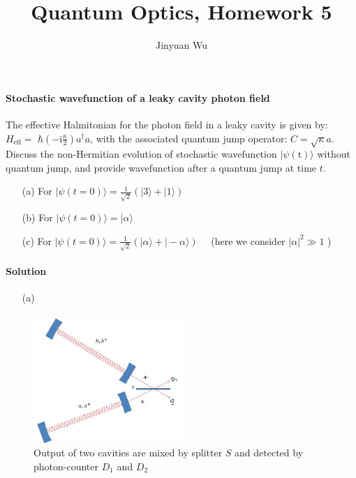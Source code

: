 \documentclass[hyperref, a4paper]{article}
\title{Quantum Optics, Homework 5}
\author{Jinyuan Wu}
\newcommand*{\ii}{\mathrm{i}}
\begin{document}
\maketitle

\paragraph{Stochastic wavefunction of a leaky cavity photon field} The effective Halmitonian for the photon field in a leaky cavity is given by: $H_\text{eff}=$ $\hbar\left(- \ii \frac{\kappa}{2}\right) a^{\dagger} a$, with the associated quantum jump operator: ${C}=\sqrt{\kappa} {a}$.
Discuss the non-Hermitian evolution of stochastic wavefunction $|\psi(\mathrm{t})\rangle$ without quantum jump, and provide wavefunction after a quantum jump at time $t$.
\begin{itemize}
\item[(a)] For $|\psi({t}=0)\rangle=\frac{1}{\sqrt{2}}(|3\rangle+|1\rangle)$
\item[(b)] For $|\psi({t}=0)\rangle=|\alpha\rangle$
\item[(c)] For $|\psi({t}=0)\rangle=\frac{1}{\sqrt{2}}(|\alpha\rangle+|-\alpha\rangle) \quad$ (here we consider $|\alpha|^{2} \gg 1$ )
\end{itemize}

\paragraph{Solution} \begin{itemize}
\item[(a)] 
\end{itemize}

\paragraph{} 

\begin{figure}
    \centering
    \includegraphics[width=0.5\textwidth]{fig2.png}
    \caption{Output of two cavities are mixed by splitter $S$ and detected by photon-counter $D_1$ and $D_2$}
    \label{fig:prob-2}
\end{figure}
\end{document}

